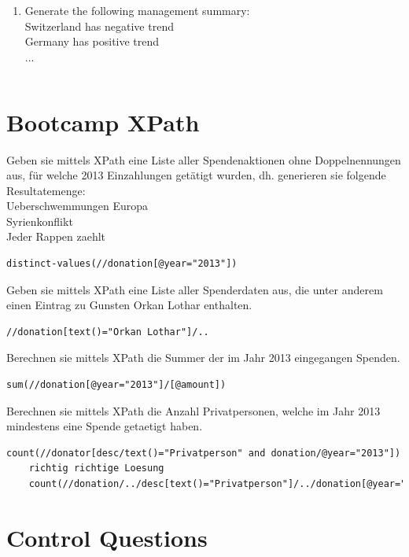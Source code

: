 \begin{enumerate}
\item Generate the following management summary:\\
Switzerland has negative trend\\
Germany has positive trend\\...
\begin{lstlisting}[language=XML]
\end{lstlisting}
\end{enumerate}

\section {Bootcamp XPath}
Geben sie mittels XPath eine Liste aller Spendenaktionen ohne Doppelnennungen aus, für welche 2013 Einzahlungen getätigt wurden, dh. generieren sie folgende Resultatemenge:\\
Ueberschwemmungen Europa\\
Syrienkonflikt\\
Jeder Rappen zaehlt\\
\begin{lstlisting}[language=XML]
	distinct-values(//donation[@year="2013"])
\end{lstlisting}
Geben sie mittels XPath eine Liste aller Spenderdaten aus, die unter anderem einen Eintrag zu Gunsten Orkan Lothar enthalten.
\begin{lstlisting}[language=XML]
	//donation[text()="Orkan Lothar"]/..
\end{lstlisting}
Berechnen sie mittels XPath die Summer der im Jahr 2013 eingegangen Spenden.
\begin{lstlisting}[language=XML]
	sum(//donation[@year="2013"]/[@amount])
\end{lstlisting}
Berechnen sie mittels XPath die Anzahl Privatpersonen, welche im Jahr 2013 mindestens eine Spende getaetigt haben.
\begin{lstlisting}[language=XML]
	count(//donator[desc/text()="Privatperson" and donation/@year="2013"])
	richtig richtige Loesung
	count(//donation/../desc[text()="Privatperson"]/../donation[@year="2013"][1])
\end{lstlisting}
\section{Control Questions}

